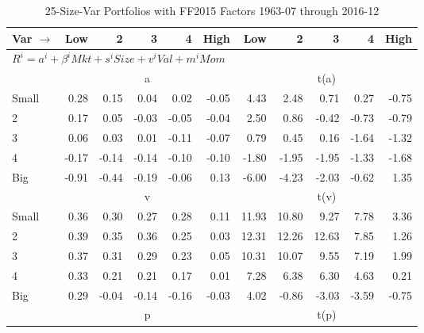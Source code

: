 
\begin{table}[!ht]
\centering
\caption{25-Size-Var Portfolios with FF2015 Factors 1963-07 through 2016-12}
\begin{tabular}{lrrrrrrrrrr}
  \toprule
    Var $\rightarrow$ & Low & 2 & 3 & 4 & High & Low & 2 & 3 & 4 & High \\ 
  \midrule
  \multicolumn{11}{l}{$R^i=a^i+\beta^iMkt+s^iSize+v^iVal+m^iMom$} \\

  
    
      & \multicolumn{5}{c}{a} & \multicolumn{5}{c}{t(a)}
    
    \\
      \cmidrule(r){2-6} \cmidrule(r){7-11}

    Small   & 0.28  & 0.15  & 0.04  & 0.02  & -0.05  & 4.43  & 2.48  & 0.71  & 0.27  & -0.75  \\
         2  & 0.17  & 0.05  & -0.03  & -0.05  & -0.04  & 2.50  & 0.86  & -0.42  & -0.73  & -0.79  \\
         3  & 0.06  & 0.03  & 0.01  & -0.11  & -0.07  & 0.79  & 0.45  & 0.16  & -1.64  & -1.32  \\
         4  & -0.17  & -0.14  & -0.14  & -0.10  & -0.10  & -1.80  & -1.95  & -1.95  & -1.33  & -1.68  \\
    Big     & -0.91  & -0.44  & -0.19  & -0.06  & 0.13  & -6.00  & -4.23  & -2.03  & -0.62  & 1.35  \\

  
    
      & \multicolumn{5}{c}{v} & \multicolumn{5}{c}{t(v)}
    
    \\
      \cmidrule(r){2-6} \cmidrule(r){7-11}

    Small   & 0.36  & 0.30  & 0.27  & 0.28  & 0.11  & 11.93  & 10.80  & 9.27  & 7.78  & 3.36  \\
         2  & 0.39  & 0.35  & 0.36  & 0.25  & 0.03  & 12.31  & 12.26  & 12.63  & 7.85  & 1.26  \\
         3  & 0.37  & 0.31  & 0.29  & 0.23  & 0.05  & 10.31  & 10.07  & 9.55  & 7.19  & 1.99  \\
         4  & 0.33  & 0.21  & 0.21  & 0.17  & 0.01  & 7.28  & 6.38  & 6.30  & 4.63  & 0.21  \\
    Big     & 0.29  & -0.04  & -0.14  & -0.16  & -0.03  & 4.02  & -0.86  & -3.03  & -3.59  & -0.75  \\

  
    
      & \multicolumn{5}{c}{p} & \multicolumn{5}{c}{t(p)}
    

\end{tabular}
\end{table}
